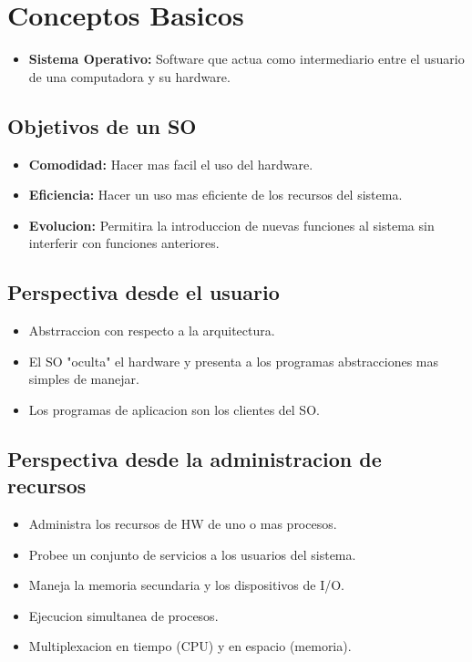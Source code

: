 \section{Conceptos Basicos}
\begin{itemize}
    \item \textbf{Sistema Operativo:} Software que actua como intermediario entre el usuario de una computadora y su hardware.
        \end{itemize}
        \subsection{Objetivos de un SO}
        \begin{itemize}
            \item \textbf{Comodidad:} Hacer mas facil el uso del hardware.
            \item \textbf{Eficiencia:} Hacer un uso mas eficiente de los recursos del sistema.
            \item \textbf{Evolucion:} Permitira la introduccion de nuevas funciones al sistema sin interferir con funciones anteriores.
        \end{itemize}
        \subsection{Perspectiva desde el usuario}
        \begin{itemize}
            \item Abstrraccion con respecto a la arquitectura.
            \item El SO "oculta" el hardware y presenta a los programas abstracciones mas simples de manejar.
            \item Los programas de aplicacion son los clientes del SO.
        \end{itemize}
        \subsection{Perspectiva desde la administracion de recursos}
        \begin{itemize}
            \item Administra los recursos de HW de uno o mas procesos.
            \item Probee un conjunto de servicios a los usuarios del sistema.
            \item Maneja la memoria secundaria y los dispositivos de I/O.
            \item Ejecucion simultanea de procesos.
            \item Multiplexacion en tiempo (CPU) y en espacio (memoria).
        \end{itemize}

